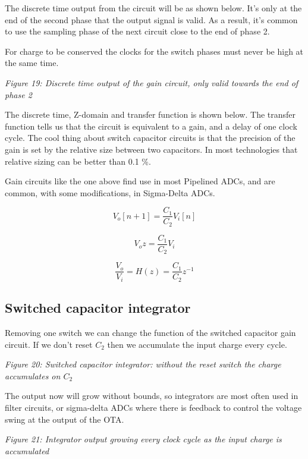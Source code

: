 The discrete time output from the circuit will be as shown below. It's
only at the end of the second phase that the output signal is valid. As
a result, it's common to use the sampling phase of the next circuit
close to the end of phase 2.

For charge to be conserved the clocks for the switch phases must never
be high at the same time.


{
\centering
{}
}

\emph{Figure 19: Discrete time output of the gain circuit, only valid
towards the end of phase 2}

The discrete time, Z-domain and transfer function is shown below. The
transfer function tells us that the circuit is equivalent to a gain, and
a delay of one clock cycle. The cool thing about switch capacitor
circuits is that the precision of the gain is set by the relative size
between two capacitors. In most technologies that relative sizing can be
better than 0.1 \%.

Gain circuits like the one above find use in most Pipelined ADCs, and
are common, with some modifications, in Sigma-Delta ADCs.

\[ V_o[n+1] = \frac{C_1}{C_2}V_i[n]\]

\[ V_o z = \frac{C_1}{C_2} V_i\]

\[ \frac{V_o}{V_i} = H(z) = \frac{C_1}{C_2}z^{-1}\]

\subsection{Switched capacitor
integrator}\label{switched-capacitor-integrator}

Removing one switch we can change the function of the switched capacitor
gain circuit. If we don't reset \(C_2\) then we accumulate the input
charge every cycle.


{
\centering
{}
}

\emph{Figure 20: Switched capacitor integrator: without the reset switch
the charge accumulates on \(C_2\)}

The output now will grow without bounds, so integrators are most often
used in filter circuits, or sigma-delta ADCs where there is feedback to
control the voltage swing at the output of the OTA.


{
\centering
{}
}

\emph{Figure 21: Integrator output growing every clock cycle as the
input charge is accumulated}

